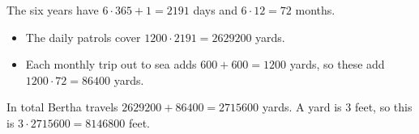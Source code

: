 The six years have $6\cdot365+1=2191$ days and $6\cdot12=72$ months.
\begin{itemize}
\item The daily patrols cover $1200\cdot2191=2629200$ yards.
\item Each monthly trip out to sea adds $600+600=1200$ yards, so these add $1200\cdot72=86400$ yards.
\end{itemize}
In total Bertha travels $2629200+86400=2715600$ yards. A yard is $3$ feet, so this is $3\cdot2715600=\boxed{8146800}$ feet.
